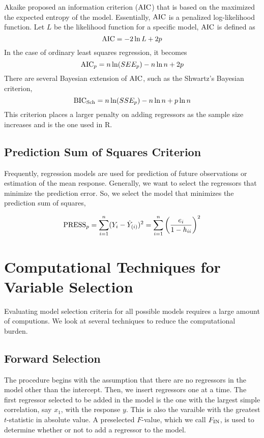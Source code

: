 Akaike proposed an information criterion ($\operatorname{AIC}$) that is based on the maximized the expected entropy of the model. Essentially, $\operatorname{AIC}$ is a penalized log-likelihood function. Let $L$ be the likelihood function for a specific model, $\operatorname{AIC}$ is defined as
\[\operatorname{AIC} = -2\ln L + 2p\]
In the case of ordinary least squares regression, it becomes 
\[\operatorname{AIC}_p = n\ln (SEE_p) - n\ln n + 2p\]
There are several Bayesian extension of $\operatorname{AIC}$, such as the Shwartz's Bayesian criterion, 
\[\operatorname{BIC}_{\operatorname{Sch}} = n\ln(SSE_p) - n\ln n + p \ln n\]
This criterion places a larger penalty on adding regressors as the sample size increases and is the one used in R. 

\subsection{Prediction Sum of Squares Criterion}

Frequently, regression models are used for prediction of future observations or estimation of the mean response. Generally, we want to select the regressors that minimize the prediction error. So, we select the model that minimizes the prediction sum of squares,

\[\operatorname{PRESS}_p = \sum_{i=1}^n (Y_i - \hat{Y}_{(i)})^2 = \sum_{i=1}^n \left(\frac{e_i}{1-h_{ii}}\right)^2\]

\section{Computational Techniques for Variable Selection}

Evaluating model selection criteria for all possible models requires a large amount of computions. We look at several techniques to reduce the computational burden.

\subsection{Forward Selection}

The procedure begins with the assumption that there are no regressors in the model other than the intercept. Then, we insert regressors one at a time. The first regressor selected to be added in the model is the one with the largest simple correlation, say $x_1$, with the response $y$. This is also the varaible with the greatest $t$-statistic in absolute value. A preselected $F$-value, which we call $F_{\operatorname{IN}}$, is used to determine whether or not to add a regressor to the model.\\

